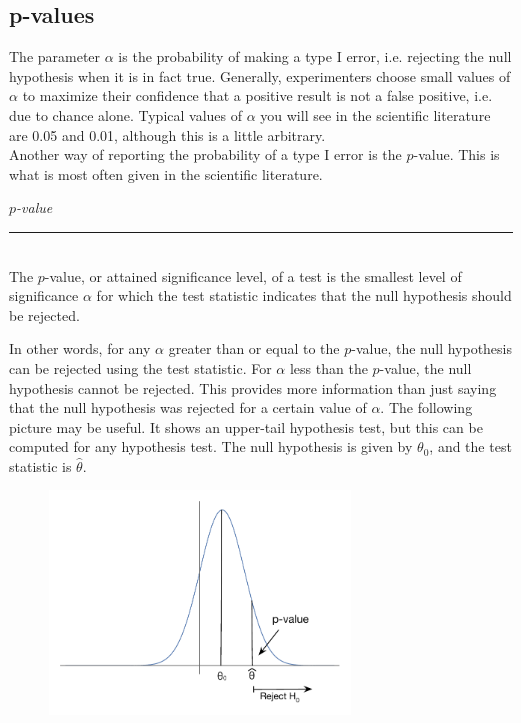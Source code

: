 \documentclass[notes.tex]{subfiles}
\begin{document}
\subsection{p-values}
The parameter $\alpha$ is the probability of making a type I error, i.e. rejecting the null hypothesis when it is in fact true. Generally, experimenters choose small values of $\alpha$ to maximize their confidence that a positive result is not a false positive, i.e. due to chance alone. Typical values of $\alpha$ you will see in the scientific literature are 0.05 and 0.01, although this is a little arbitrary. \\

Another way of reporting the probability of a type I error is the $p$-value. This is what is most often given in the scientific literature.

\begin{framed}
\emph{$p$-value}\\
  \rule{\dimexpr{}\fboxrule}{.1pt} \\
The $p$-value, or attained significance level, of a test is the smallest level of significance $\alpha$ for which the test statistic indicates that the null hypothesis should be rejected.
\end{framed}

In other words, for any $\alpha$ greater than or equal to the $p$-value, the null hypothesis can be rejected using the test statistic. For $\alpha$ less than the $p$-value, the null hypothesis cannot be rejected. This provides more information than just saying that the null hypothesis was rejected for a certain value of $\alpha$. The following picture may be useful. It shows an upper-tail hypothesis test, but this can be computed for any hypothesis test. The null hypothesis is given by $\theta_0$, and the test statistic is $\hat{\theta}$.

\begin{figure}[H]
\centering
\includegraphics[width=8cm]{pvalues}
\end{figure}
\end{document}
